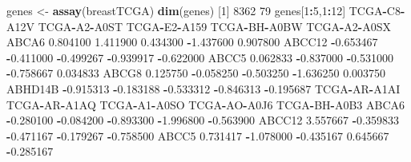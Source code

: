 \documentclass[]{article}
\newenvironment{Shaded}{\begin{snugshade}}{\end{snugshade}}
\newcommand{\KeywordTok}[1]{\textcolor[rgb]{0.13,0.29,0.53}{\textbf{#1}}}
\newcommand{\DecValTok}[1]{\textcolor[rgb]{0.00,0.00,0.81}{#1}}
\newcommand{\FloatTok}[1]{\textcolor[rgb]{0.00,0.00,0.81}{#1}}
\newcommand{\StringTok}[1]{\textcolor[rgb]{0.31,0.60,0.02}{#1}}
\newcommand{\OperatorTok}[1]{\textcolor[rgb]{0.81,0.36,0.00}{\textbf{#1}}}
\newcommand{\NormalTok}[1]{#1}
\begin{document}
\begin{Shaded}
\begin{Highlighting}[]
\NormalTok{genes <-}\StringTok{ }\KeywordTok{assay}\NormalTok{(breastTCGA)}
\KeywordTok{dim}\NormalTok{(genes)}
\NormalTok{[}\DecValTok{1}\NormalTok{] }\DecValTok{8362}   \DecValTok{79}
\NormalTok{genes[}\DecValTok{1}\OperatorTok{:}\DecValTok{5}\NormalTok{,}\DecValTok{1}\OperatorTok{:}\DecValTok{12}\NormalTok{]}
\NormalTok{        TCGA}\OperatorTok{-}\NormalTok{C8}\OperatorTok{-}\NormalTok{A12V TCGA}\OperatorTok{-}\NormalTok{A2}\OperatorTok{-}\NormalTok{A0ST TCGA}\OperatorTok{-}\NormalTok{E2}\OperatorTok{-}\NormalTok{A159 TCGA}\OperatorTok{-}\NormalTok{BH}\OperatorTok{-}\NormalTok{A0BW TCGA}\OperatorTok{-}\NormalTok{A2}\OperatorTok{-}\NormalTok{A0SX}
\NormalTok{ABCA6       }\FloatTok{0.804100}     \FloatTok{1.411900}     \FloatTok{0.434300}    \OperatorTok{-}\FloatTok{1.437600}     \FloatTok{0.907800}
\NormalTok{ABCC12     }\OperatorTok{-}\FloatTok{0.653467}    \OperatorTok{-}\FloatTok{0.411000}    \OperatorTok{-}\FloatTok{0.499267}    \OperatorTok{-}\FloatTok{0.939917}    \OperatorTok{-}\FloatTok{0.622000}
\NormalTok{ABCC5       }\FloatTok{0.062833}    \OperatorTok{-}\FloatTok{0.837000}    \OperatorTok{-}\FloatTok{0.531000}    \OperatorTok{-}\FloatTok{0.758667}     \FloatTok{0.034833}
\NormalTok{ABCG8       }\FloatTok{0.125750}    \OperatorTok{-}\FloatTok{0.058250}    \OperatorTok{-}\FloatTok{0.503250}    \OperatorTok{-}\FloatTok{1.636250}     \FloatTok{0.003750}
\NormalTok{ABHD14B    }\OperatorTok{-}\FloatTok{0.915313}    \OperatorTok{-}\FloatTok{0.183188}    \OperatorTok{-}\FloatTok{0.533312}    \OperatorTok{-}\FloatTok{0.846313}    \OperatorTok{-}\FloatTok{0.195687}
\NormalTok{        TCGA}\OperatorTok{-}\NormalTok{AR}\OperatorTok{-}\NormalTok{A1AI TCGA}\OperatorTok{-}\NormalTok{AR}\OperatorTok{-}\NormalTok{A1AQ TCGA}\OperatorTok{-}\NormalTok{A1}\OperatorTok{-}\NormalTok{A0SO TCGA}\OperatorTok{-}\NormalTok{AO}\OperatorTok{-}\NormalTok{A0J6 TCGA}\OperatorTok{-}\NormalTok{BH}\OperatorTok{-}\NormalTok{A0B3}
\NormalTok{ABCA6      }\OperatorTok{-}\FloatTok{0.280100}    \OperatorTok{-}\FloatTok{0.084200}    \OperatorTok{-}\FloatTok{0.893300}    \OperatorTok{-}\FloatTok{1.996800}    \OperatorTok{-}\FloatTok{0.563900}
\NormalTok{ABCC12      }\FloatTok{3.557667}    \OperatorTok{-}\FloatTok{0.359833}    \OperatorTok{-}\FloatTok{0.471167}    \OperatorTok{-}\FloatTok{0.179267}    \OperatorTok{-}\FloatTok{0.758500}
\NormalTok{ABCC5       }\FloatTok{0.731417}    \OperatorTok{-}\FloatTok{1.078000}    \OperatorTok{-}\FloatTok{0.435167}     \FloatTok{0.645667}    \OperatorTok{-}\FloatTok{0.285167}

\end{Highlighting}
\end{Shaded}
\end{document}
